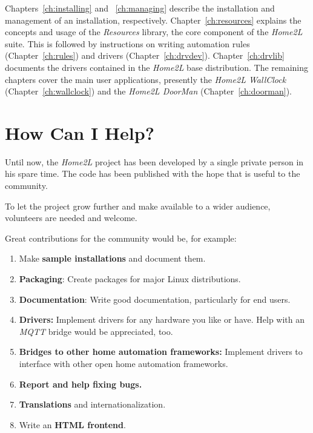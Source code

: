 \documentclass[12pt,english,parskip=half]{scrreprt}
\begin{document}
Chapters~\ref{ch:installing} and ~\ref{ch:managing} describe the installation and management
of an installation, respectively. Chapter~\ref{ch:resources} explains the concepts and usage
of the \emph{Resources} library, the core component of the \emph{Home2L} suite.
This is followed by instructions on writing automation rules (Chapter~\ref{ch:rules}) and
drivers (Chapter~\ref{ch:drvdev}).
Chapter~\ref{ch:drvlib} documents the drivers contained in the \emph{Home2L} base distribution.
The remaining chapters cover the main user applications, presently
the \emph{Home2L WallClock} (Chapter~\ref{ch:wallclock}) and
the \emph{Home2L DoorMan} (Chapter~\ref{ch:doorman}).





\section{How Can I Help?}
\label{sec:helping}


Until now, the \emph{Home2L}  project has been developed by a single private person
in his spare time. The code has been published with the hope that is useful to
the community.

To let the project grow further and make available to a wider audience,
volunteers are needed and welcome.

Great contributions for the community would be, for example:

\begin{enumerate}
  \item Make \textbf{sample installations} and document them.

  \item \textbf{Packaging}: Create packages for major Linux distributions.

  \item \textbf{Documentation}: Write good documentation, particularly for end users.

  \item \textbf{Drivers:} Implement drivers for any hardware you like or have.
    Help with an \emph{MQTT} bridge would be appreciated, too.

  \item \textbf{Bridges to other home automation frameworks:} Implement drivers to interface
    with other open home automation frameworks.

  \item \textbf{Report and help fixing bugs.}

  \item \textbf{Translations} and internationalization.

  \item Write an \textbf{HTML frontend}.
\end{enumerate}
\end{document}
